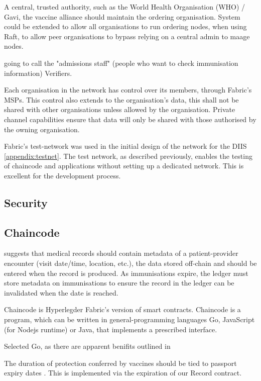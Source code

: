 A central, trusted authority, such as the World Health Organisation (WHO) / Gavi, the vaccine alliance should maintain the ordering organisation. %
System could be extended to allow all organisations to run ordering nodes, when using Raft, to allow peer organisations to bypass relying on a central admin to maage nodes. \cite{noauthor_ordering_nodate} 

going to call the "admissions staff" (people who want to check immunisation information) Verifiers.

Each organisation in the network has control over its members, through Fabric's MSPs. 
This control also extends to the organisation's data, this shall not be shared with other organisations unless allowed by the organisation. 
Private channel capabilities ensure that data will only be shared with those authorised by the owning organisation. 

Fabric's test-network was used in the initial design of the network for the DIIS \ref{appendix:testnet}. The test network, as described previously, enables the testing of chaincode and applications without setting up a dedicated network. 
This is excellent for the development process. 

\subsection{Security}

\subsection{Chaincode}

\cite{alexaki_blockchain-based_2018} suggests that medical records should contain metadata of a patient-provider encounter (visit date/time, location, etc.), 
the data stored off-chain and should be entered when the record is produced. As immunisations expire, the ledger must store metadata on immunisations to ensure the record in the ledger can be invalidated when the date is reached.

Chaincode is Hyperlegder Fabric's version of smart contracts. Chaincode is a program, which can be written in general-programming languages Go, JavaScript (for Nodejs runtime) or Java, that implements a prescribed interface.

Selected Go, as there are apparent benifits outlined in \cite{foschini_hyperledger_2020}

The duration of protection conferred by vaccines should
be tied to passport expiry dates \cite{dye_covid-19_2021}.
This is implemented via the expiration of our Record contract.

